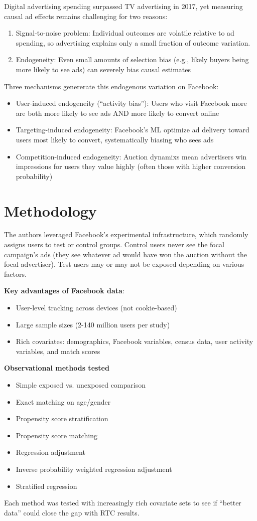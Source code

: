 \documentclass[10pt]{article}
\begin{document}
Digital advertising spending surpassed TV advertising in 2017, yet measuring causal ad effects remains challenging for two reasons: 
\begin{enumerate}
    \item Signal-to-noise problem: Individual outcomes are volatile relative to ad spending, so advertising explains only a small fraction of outcome variation. 
    \item Endogeneity: Even small amounts of selection bias (e.g., likely buyers being more likely to see ads) can severely bias causal estimates
\end{enumerate}
Three mechanisms genererate this endogenous variation on Facebook: 
\begin{itemize}
    \item User-induced endogeneity (``activity bias''): Users who visit Facebook more are both more likely to see ads AND more likely to convert online 
    \item Targeting-induced endogeneity: Facebook's ML optimize ad delivery toward users most likely to convert, systematically biasing who sees ads 
    \item Competition-induced endogeneity: Auction dynamixs mean advertisers win impressions for users they value highly (often those with higher conversion probability)
\end{itemize}
\newpage
\section{Methodology}
The authors leveraged Facebook's experimental infrastructure, which randomly assigns users to test or control groups. Control users never see the focal campaign's ads (they see whatever ad would have won the auction without the focal advertiser). Test users may or may not be exposed depending on various factors. 

\textbf{Key advantages of Facebook data}:
\begin{itemize}
    \item User-level tracking across devices (not cookie-based)
    \item Large sample sizes (2-140 million users per study)
    \item Rich covariates: demographics, Facebook variables, census data, user activity variables, and match scores 
\end{itemize}
\textbf{Observational methods tested}
\begin{itemize}
    \item Simple exposed vs. unexposed comparison 
    \item Exact matching on age/gender 
    \item Propensity score stratification 
    \item Propensity score matching
    \item Regression adjustment 
    \item Inverse probability weighted regression adjustment
    \item Stratified regression
\end{itemize}
Each method was tested with increasingly rich covariate sets to see if ``better data'' could close the gap with RTC results. 
\end{document}
